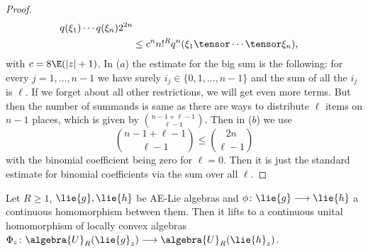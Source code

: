 \begin{proof}
\begin{align*}
        q(\xi_1) \cdots q(\xi_n)
        2^{2n}
        \\
        &\leq
        c^n n!^R q^n(\xi_1 \tensor \cdots \tensor \xi_n),
    \end{align*}
    with $c = 8 \E (|z| + 1)$. In ($a$) the estimate for the big sum
    is the following: for every $j = 1, \ldots, n-1$ we have surely
    $i_j \in \{0, 1, \ldots, n-1\}$ and the sum of all the $i_j$ is
    $\ell$. If we forget about all other restrictions, we will get
    even more terms. But then the number of summands is same as there
    are ways to distribute $\ell$ items on $n-1$ places, which is
    given by $\binom{n - 1 + \ell - 1}{\ell - 1}$. Then in ($b$) we
    use
    \begin{equation*}
        \binom{n - 1 + \ell - 1}{\ell - 1} \leq \binom{2 n}{\ell - 1}
    \end{equation*}
    with the binomial coefficient being zero for $\ell = 0$. Then it
    is just the standard estimate for binomial coefficients via the
    sum over all $\ell$.
\end{proof}
\begin{proposition}[Functoriality]
	\label{proposition:Functoriality}
	Let $R \geq 1$, $\lie{g}, \lie{h}$ be AE-Lie algebras and $\phi \colon
	\lie{g} \longrightarrow \lie{h}$ a continuous homomorphism between them.
	Then it lifts to a continuous unital homomorphism of locally convex
	algebras $\Phi_z \colon \algebra{U}_R(\lie{g}_z) \longrightarrow
	\algebra{U}_R(\lie{h}_z)$.
\end{proposition}
